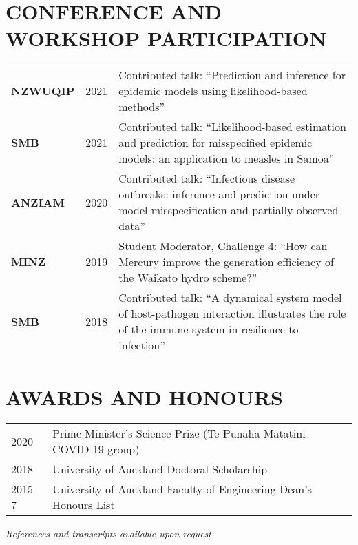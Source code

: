 \documentclass[paper=a4paper,fontsize=11pt]{scrartcl} %
\newlength{\spacebox}
\newcommand{\NewPart}[1]{\section*{\uppercase{#1}}}
\begin{document}
\NewPart{Conference and Workshop Participation}
\begin{tabular}{p{\spacebox} p{0.5\spacebox} p{6.7\spacebox}}
\textbf{NZWUQIP} & {2021} & {Contributed talk: ``Prediction and inference for epidemic models using likelihood-based methods''}\\
\textbf{SMB} & {2021} & {Contributed talk: ``Likelihood-based  estimation and prediction for misspecified epidemic models: an application to measles in Samoa''}\\
\textbf{ANZIAM} & {2020} & {Contributed talk: ``Infectious disease outbreaks: inference and prediction under model misspecification and partially observed data''}\\
\textbf{MINZ} & {2019} & {Student Moderator, Challenge 4: ``How can Mercury improve the generation efficiency of the Waikato hydro scheme?''}\\
\textbf{SMB} & {2018} & {Contributed talk: ``A dynamical system model of host-pathogen interaction illustrates the role of the immune system in resilience to infection''}\\
\end{tabular}

\NewPart{Awards and Honours}
\begin{tabular}{p{1.0\spacebox} p{6.7\spacebox}}
    2020 & Prime Minister's Science Prize (Te P\=unaha Matatini COVID-19 group)\\
    2018 & University of Auckland Doctoral Scholarship\\
    2015-7 & University of Auckland Faculty of Engineering Dean's Honours List\\
\end{tabular}

\vspace{1ex} \titlerule[2pt] \vspace{1ex}
\textit{References and transcripts available upon request}
\end{document}
